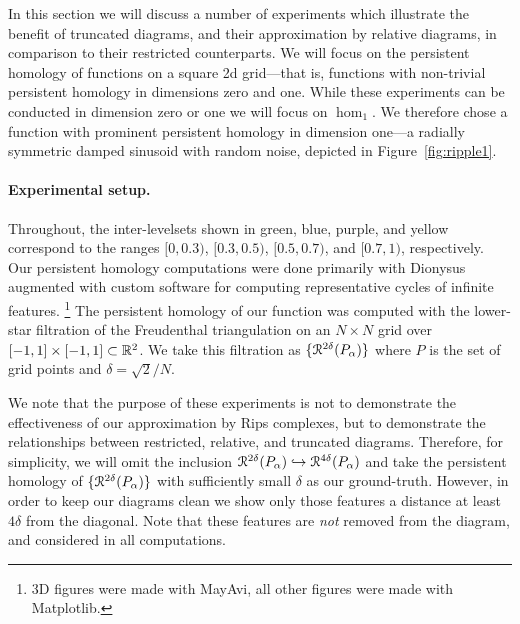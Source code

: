 
In this section we will discuss a number of experiments which illustrate the benefit of truncated diagrams, and their approximation by relative diagrams, in comparison to their restricted counterparts.
We will focus on the persistent homology of functions on a square 2d grid---that is, functions with non-trivial persistent homology in dimensions zero and one.
While these experiments can be conducted in dimension zero or one we will focus on $\hom_1$.
We therefore chose a function with prominent persistent homology in dimension one---a radially symmetric damped sinusoid with random noise, depicted in Figure~\ref{fig:ripple1}.

\paragraph{Experimental setup.}

Throughout, the inter-levelsets shown in green, blue, purple, and yellow correspond to the ranges $[0, 0.3)$, $[0.3, 0.5)$, $[0.5, 0.7)$, and $[0.7, 1)$, respectively.
Our persistent homology computations were done primarily with Dionysus augmented with custom software for computing representative cycles of infinite features.
\footnote{3D figures were made with MayAvi, all other figures were made with Matplotlib.}
The persistent homology of our function was computed with the lower-star filtration of the Freudenthal triangulation on an $N\times N$ grid over $[-1,1]\times[-1,1]\subset\mathbb{R}^2$.
We take this filtration as $\{\mathcal{R}^{2\delta}(P_\alpha)\}$ where $P$ is the set of grid points and $\delta = \sqrt{2} / N$.

We note that the purpose of these experiments is not to demonstrate the effectiveness of our approximation by Rips complexes, but to demonstrate the relationships between restricted, relative, and truncated diagrams.
Therefore, for simplicity, we will omit the inclusion $\mathcal{R}^{2\delta}(P_\alpha)\hookrightarrow\mathcal{R}^{4\delta}(P_\alpha)$ and take the persistent homology of $\{\mathcal{R}^{2\delta}(P_\alpha)\}$ with sufficiently small $\delta$ as our ground-truth.
However, in order to keep our diagrams clean we show only those features a distance at least $4\delta$ from the diagonal.
Note that these features are \emph{not} removed from the diagram, and considered in all computations.

